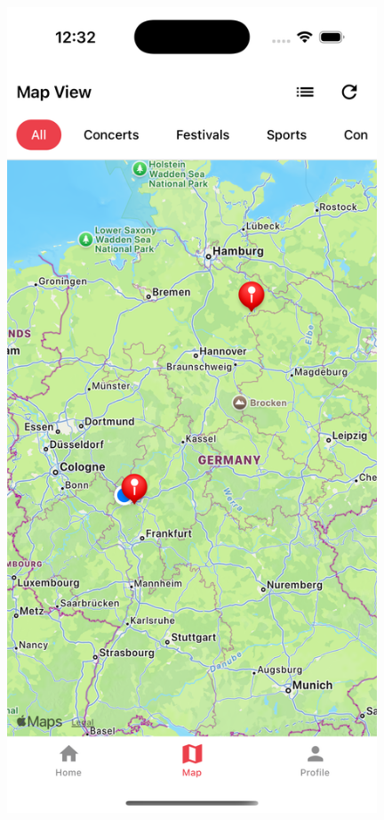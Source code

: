 \begin{figure}[htbp]
      \centering
      \begin{minipage}{0.48\textwidth}
            \centering
            \includegraphics[width=0.98\textwidth]{images/cursor_screenshots/final-mapscreen-cursor-3.png}

\end{minipage}
\end{figure}
